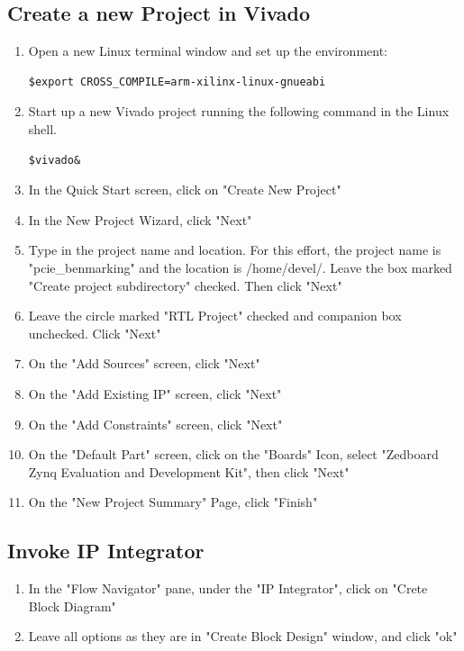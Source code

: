 \documentclass[12pt]{article}
\begin{document}
\subsection{Create a new Project in Vivado} \label{subsec:new project}
\begin{enumerate}
\item Open a new Linux terminal window and set up the environment:
\begin{lstlisting}
$export CROSS_COMPILE=arm-xilinx-linux-gnueabi
\end{lstlisting}
\item Start up a new Vivado project running the following command in the Linux shell.

\begin{lstlisting}
$vivado&
\end{lstlisting}

\item In the Quick Start screen, click on "Create New Project"
\item In the New Project Wizard, click "Next"
\item Type in the project name and location.  For this effort, the project name is "pcie\_benmarking" and the location is /home/devel/.  Leave the box marked "Create project subdirectory" checked.  Then click "Next"\label{itm:project name}
\item Leave the circle marked "RTL Project" checked and companion box unchecked.  Click "Next"
\item On the "Add Sources" screen, click "Next" %
\item On the "Add Existing IP" screen, click "Next"
\item On the "Add Constraints" screen, click "Next"
\item On the "Default Part" screen, click on the "Boards" Icon, select "Zedboard Zynq Evaluation and Development Kit", then click "Next"
\item On the "New Project Summary" Page, click "Finish"
\end{enumerate}

\subsection{Invoke IP Integrator}
\begin{enumerate}
\item In the "Flow Navigator" pane, under the "IP Integrator", click on "Crete Block Diagram"
\item Leave all options as they are in "Create Block Design" window, and click "ok"
\end{enumerate}
\end{document}
